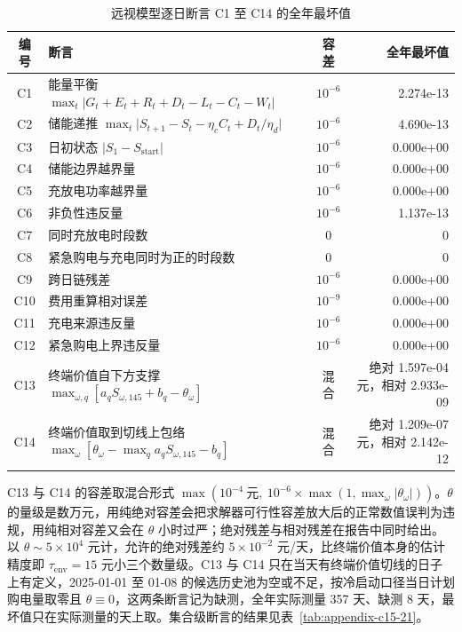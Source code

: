 \begin{appendices}
\begin{table}[htbp]
  \centering
  \small
  \caption{远视模型逐日断言 C1 至 C14 的全年最坏值}
  \label{tab:appendix-c1-14}
  \begin{tabularx}{\textwidth}{@{}c L c R@{}}
    \toprule
    编号 & 断言 & 容差 & 全年最坏值 \\
    \midrule
    C1 & 能量平衡 $\max_t\lvert G_t+E_t+R_t+D_t-L_t-C_t-W_t\rvert$ & $10^{-6}$ & 2.274e-13 \\
    C2 & 储能递推 $\max_t\lvert S_{t+1}-S_t-\eta_cC_t+D_t/\eta_d\rvert$ & $10^{-6}$ & 4.690e-13 \\
    C3 & 日初状态 $\lvert S_1-S_{\mathrm{start}}\rvert$ & $10^{-6}$ & 0.000e+00 \\
    C4 & 储能边界越界量 & $10^{-6}$ & 0.000e+00 \\
    C5 & 充放电功率越界量 & $10^{-6}$ & 0.000e+00 \\
    C6 & 非负性违反量 & $10^{-6}$ & 1.137e-13 \\
    C7 & 同时充放电时段数 & 0 & 0 \\
    C8 & 紧急购电与充电同时为正的时段数 & 0 & 0 \\
    C9 & 跨日链残差 & $10^{-6}$ & 0.000e+00 \\
    C10 & 费用重算相对误差 & $10^{-9}$ & 0.000e+00 \\
    C11 & 充电来源违反量 & $10^{-6}$ & 0.000e+00 \\
    C12 & 紧急购电上界违反量 & $10^{-6}$ & 0.000e+00 \\
    C13 & 终端价值自下方支撑 $\max_{\omega,q}[a_qS_{\omega,145}+b_q-\theta_\omega]$ & 混合 & 绝对 1.597e-04 元，相对 2.933e-09 \\
    C14 & 终端价值取到切线上包络 $\max_\omega[\theta_\omega-\max_qa_qS_{\omega,145}-b_q]$ & 混合 & 绝对 1.209e-07 元，相对 2.142e-12 \\
    \bottomrule
  \end{tabularx}
\end{table}

C13 与 C14 的容差取混合形式 $\max(10^{-4}\ \text{元},\ 10^{-6}\times\max(1,\max_\omega\lvert\theta_\omega\rvert))$。$\theta$ 的量级是数万元，用纯绝对容差会把求解器可行性容差放大后的正常数值误判为违规，用纯相对容差又会在 $\theta$ 小时过严；绝对残差与相对残差在报告中同时给出。以 $\theta\sim5\times10^4$ 元计，允许的绝对残差约 $5\times10^{-2}$ 元/天，比终端价值本身的估计精度即 $\tau_{\mathrm{env}}=15$ 元小三个数量级。C13 与 C14 只在当天有终端价值切线的日子上有定义，2025-01-01 至 01-08 的候选历史池为空或不足，按冷启动口径当日计划购电量取零且 $\theta\equiv0$，这两条断言记为缺测，全年实际测量 357 天、缺测 8 天，最坏值只在实际测量的天上取。集合级断言的结果见表~\ref{tab:appendix-c15-21}。


\end{appendices}
